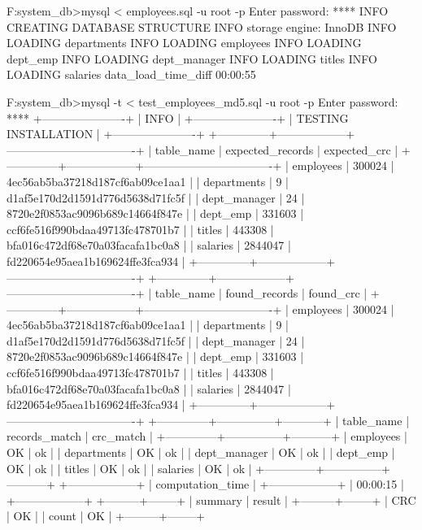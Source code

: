 F:\OneDrive\USTH{}\Information system\test_db>mysql < employees.sql -u root -p
Enter password: ****
INFO
CREATING DATABASE STRUCTURE
INFO
storage engine: InnoDB
INFO
LOADING departments
INFO
LOADING employees
INFO
LOADING dept_emp
INFO
LOADING dept_manager
INFO
LOADING titles
INFO
LOADING salaries
data_load_time_diff
00:00:55

F:\OneDrive\USTH{}\Information system\test_db>mysql -t < test_employees_md5.sql -u root -p
Enter password: ****
+----------------------+
| INFO                 |
+----------------------+
| TESTING INSTALLATION |
+----------------------+
+--------------+------------------+----------------------------------+
| table_name   | expected_records | expected_crc                     |
+--------------+------------------+----------------------------------+
| employees    |           300024 | 4ec56ab5ba37218d187cf6ab09ce1aa1 |
| departments  |                9 | d1af5e170d2d1591d776d5638d71fc5f |
| dept_manager |               24 | 8720e2f0853ac9096b689c14664f847e |
| dept_emp     |           331603 | ccf6fe516f990bdaa49713fc478701b7 |
| titles       |           443308 | bfa016c472df68e70a03facafa1bc0a8 |
| salaries     |          2844047 | fd220654e95aea1b169624ffe3fca934 |
+--------------+------------------+----------------------------------+
+--------------+------------------+----------------------------------+
| table_name   | found_records    | found_crc                        |
+--------------+------------------+----------------------------------+
| employees    |           300024 | 4ec56ab5ba37218d187cf6ab09ce1aa1 |
| departments  |                9 | d1af5e170d2d1591d776d5638d71fc5f |
| dept_manager |               24 | 8720e2f0853ac9096b689c14664f847e |
| dept_emp     |           331603 | ccf6fe516f990bdaa49713fc478701b7 |
| titles       |           443308 | bfa016c472df68e70a03facafa1bc0a8 |
| salaries     |          2844047 | fd220654e95aea1b169624ffe3fca934 |
+--------------+------------------+----------------------------------+
+--------------+---------------+-----------+
| table_name   | records_match | crc_match |
+--------------+---------------+-----------+
| employees    | OK            | ok        |
| departments  | OK            | ok        |
| dept_manager | OK            | ok        |
| dept_emp     | OK            | ok        |
| titles       | OK            | ok        |
| salaries     | OK            | ok        |
+--------------+---------------+-----------+
+------------------+
| computation_time |
+------------------+
| 00:00:15         |
+------------------+
+---------+--------+
| summary | result |
+---------+--------+
| CRC     | OK     |
| count   | OK     |
+---------+--------+


